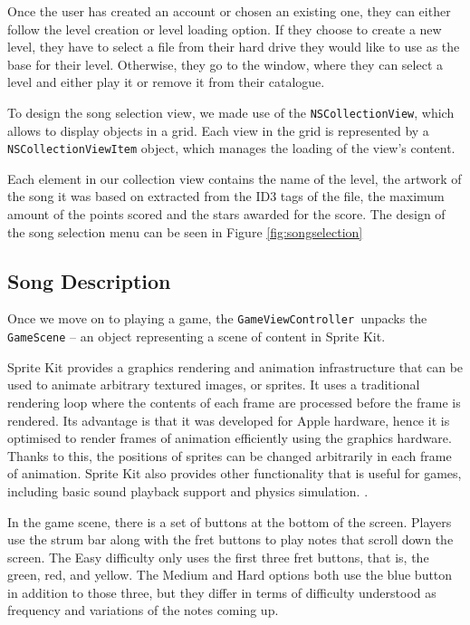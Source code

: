 Once the user has created an account or chosen an existing one, they can either follow the level creation or level loading option. If they choose to create a new level, they have to select a file from their hard drive they would like to use as the base for their level. Otherwise, they go to the window, where they can select a level and either play it or remove it from their catalogue.

To design the song selection view, we made use of the \verb|NSCollectionView|, which allows to display objects in a grid. Each view in the grid is represented by a \verb|NSCollectionViewItem| object, which manages the loading of the view's content.

Each element in our collection view contains the name of the level, the artwork of the song it was based on extracted from the ID3 tags of the file, the maximum amount of the points scored and the stars awarded for the score. The design of the song selection menu can be seen in Figure \ref{fig:songselection}

\vspace{10pt}

\subsection{Song Description}

Once we move on to playing a game, the \verb|GameViewController|~unpacks the \verb|GameScene| -- an object representing a scene of content in Sprite Kit.

Sprite Kit provides a graphics rendering and animation infrastructure that can be used to animate arbitrary textured images, or sprites. It uses a traditional rendering loop where the contents of each frame are processed before the frame is rendered. Its advantage is that it was developed for Apple hardware, hence it is optimised to render frames of animation efficiently using the graphics hardware. Thanks to this, the positions of sprites can be changed arbitrarily in each frame of animation. Sprite Kit also provides other functionality that is useful for games, including basic sound playback support and physics simulation. \cite{spritekit}. 

In the game scene, there is a set of buttons at the bottom of the screen. Players use the strum bar along with the fret buttons to play notes that scroll down the screen. The Easy difficulty only uses the first three fret buttons, that is, the green, red, and yellow. The Medium and Hard options both use the blue button in addition to those three, but they differ in terms of difficulty understood as frequency and variations of the notes coming up.


